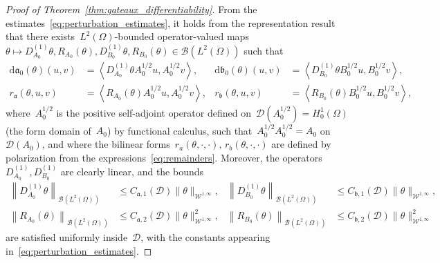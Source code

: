 \documentclass[a4]{article}
\renewcommand{\d}{\mathrm{d}}
\newcommand{\fa}{\mathfrak{a}}
\newcommand{\fb}{\mathfrak{b}}
\newcommand{\1}{\mathbbm 1}
\newcommand{\Winf}{{{\cW}^{1,\infty}}}
\newcommand{\cW}{\mathcal{W}}
\begin{document}
\begin{proof}[Proof of Theorem~\ref{thm:gateaux_differentiability}]
    From the estimates~\eqref{eq:perturbation_estimates}, it holds from the representation result~\cite[Lemma VI.3.1]{K13} that there exists~$L^2(\Omega)$-bounded operator-valued maps~$\theta \mapsto D_{A_0}^{(1)}\theta,R_{A_0}(\theta),D_{B_0}^{(1)}\theta,R_{B_0}(\theta) \in \mathcal B(L^2(\Omega))$ such that
    \begin{equation}
        \label{eq:representation_formulae}
        \begin{aligned}
            \d \fa_0(\theta)(u,v) &= \left\langle D_{A_0}^{(1)}\theta A_0^{1/2}u,A_0^{1/2}v\right\rangle,&\d \fb_0(\theta)(u,v) &= \left\langle D_{B_0}^{(1)}\theta B_0^{1/2}u,B_0^{1/2}v\right\rangle,\\
            r_{\fa}(\theta,u,v) &= \left\langle R_{A_0}(\theta)A_0^{1/2}u,A_0^{1/2}v\right\rangle,&r_{\fb}(\theta,u,v) &=  \left\langle R_{B_0}(\theta)B_0^{1/2}u,B_0^{1/2}v\right\rangle,
        \end{aligned}
    \end{equation}
    where~$A_0^{1/2}$ is the positive self-adjoint operator defined on~$\mathcal D(A_0^{1/2}) = H_0^1(\Omega)$ (the form domain of~$A_0$) by functional calculus, such that~$A_0^{1/2}A_0^{1/2} = A_0$ on~$\mathcal D(A_0)$,
    and where the bilinear forms~$r_a(\theta,\cdot,\cdot),\,r_b(\theta,\cdot,\cdot)$ are defined by polarization from the expressions~\eqref{eq:remainders}.
    Moreover, the operators~$D_{A_0}^{(1)},D_{B_0}^{(1)}$ are clearly linear, and the bounds
    \begin{equation}
        \label{eq:perturbation_estimates_ops}
        \begin{aligned}
        \left\|D_{A_0}^{(1)}\theta\right\|_{\mathcal B(L^2(\Omega))} &\leq C_{\fa,1}(\mathcal D) \|\theta\|_{\Winf},&\left\|D_{B_0}^{(1)}\theta\right\|_{\mathcal B(L^2(\Omega))} &\leq C_{\fb,1}(\mathcal D) \|\theta\|_{\Winf},\\
        \left\|R_{A_0}(\theta)\right\|_{\mathcal B(L^2(\Omega))} &\leq C_{\fa,2}(\mathcal D)\|\theta\|^2_{\Winf},&\left\|R_{B_0}(\theta)\right\|_{\mathcal B(L^2(\Omega))} &\leq C_{\fb,2}(\mathcal D)\|\theta\|^2_{\Winf}
        \end{aligned}
    \end{equation}
    are satisfied uniformly inside~$\mathcal D$, with the constants appearing in~\eqref{eq:perturbation_estimates}.


\end{proof}
\end{document}
